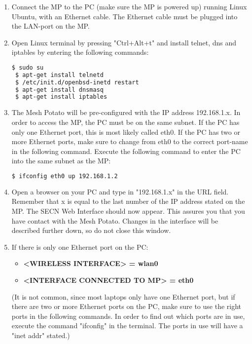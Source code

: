 

\begin{enumerate}
\item Connect the MP to the PC (make sure the MP is powered up) running Linux Ubuntu, with an Ethernet cable. The Ethernet cable must be plugged into the LAN-port on the MP. 

\item Open Linux terminal by pressing "Ctrl+Alt+t" and install telnet, dns and iptables by entering the following commands: 
\noindent
\begin{lstlisting}[language=bash]
 $ sudo su
 $ apt-get install telnetd
 $ /etc/init.d/openbsd-inetd restart 
 $ apt-get install dnsmasq
 $ apt-get install iptables
\end{lstlisting}

\item The Mesh Potato will be pre-configured with the IP address 192.168.1.x. In order to access the MP, the PC must be on the same subnet. If the PC has only one Ethernet port, this is most likely called eth0. If the PC has two or more Ethernet ports, make sure to change from eth0 to the correct port-name in the following command. Execute the following command to enter the PC into the same subnet as the MP: 
\noindent
\begin{lstlisting}[language=bash]
  $ ifconfig eth0 up 192.168.1.2
\end{lstlisting}

\item Open a browser on your PC and type in "192.168.1.x" in the URL field. Remember that x is equal to the last number of the IP address stated on the MP. The SECN Web Interface should now appear. This assures you that you have contact with the Mesh Potato. Changes in the interface will be described further down, so do not close this window.  

\item  
If there is only one Ethernet port on the PC:
\begin{itemize} 
\item [] \textbf{<WIRELESS INTERFACE> = wlan0}
\item [] \textbf{<INTERFACE CONNECTED TO MP> = eth0}
\end{itemize}

(It is not common, since most laptops only have one Ethernet port, but if there are two or more Ethernet ports on the PC, make sure to use the right ports in the following commands. In order to find out which ports are in use, execute the command "ifconfig" in the terminal. The ports in use will have a "inet addr" stated.) 


\end{enumerate}
